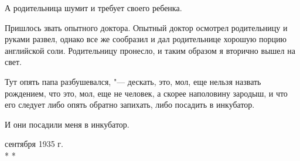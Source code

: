 А родительница шумит и требует своего
ребенка.

Пришлось звать опытного доктора. Опытный
доктор осмотрел родительницу и руками
развел, однако все же сообразил и дал родительнице 
хорошую порцию английской соли.
Родительницу пронесло, и таким образом я
вторично вышел на свет.

Тут опять папа разбушевался, "--- дескать,
это, мол, еще нельзя назвать рождением, что
это, мол, еще не человек, а скорее наполовину
зародыш, и что его следует либо опять
обратно запихать, либо посадить в инкубатор.

И они посадили меня в инкубатор.

 сентября 1935 г.\\

\centering * * *